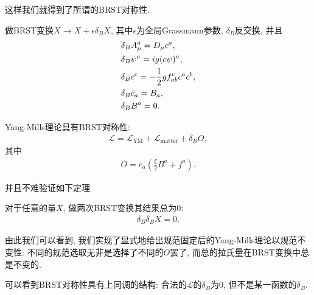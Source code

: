 这样我们就得到了所谓的BRST对称性.
\begin{definition}[BRST变换]
    做BRST变换$X\to X+\epsilon\delta_B X$, 其中$\epsilon$为全局Grassmann参数, $\delta_B$反交换, 并且
    \begin{align}
        & \delta_BA_\mu^a=D_\mu c^a,\notag\\
        & \delta_B\psi^a=ig(c\psi)^a,\notag\\
        & \delta_B c^c=-\frac12g f^{c}_{ab}c^ac^b,\notag\\
        & \delta_B\bar c_a=B_a,\notag\\
        & \delta_BB^a=0.
    \end{align}
\end{definition}
\begin{theorem}
    Yang-Mills理论具有BRST对称性:
    \begin{align}
        \mathcal L=\mathcal L_{\mathrm{YM}}+\mathcal L_{\mathrm{matter}}+\delta_BO,
    \end{align}
    其中
    \begin{align}
        O=\bar c_a\left(\frac\xi2B^a+f^a\right).
    \end{align}
\end{theorem}

并且不难验证如下定理
\begin{theorem}
    对于任意的量$X$, 做两次BRST变换其结果总为$0$:
    \begin{align}
        \delta_B\delta_BX=0.
    \end{align}
\end{theorem}

由此我们可以看到, 我们实现了显式地给出规范固定后的Yang-Mills理论以规范不变性: 不同的规范选取无非是选择了不同的$O$罢了, 而总的拉氏量在BRST变换中总是不变的. 

可以看到BRST对称性具有上同调的结构: 合法的$\mathcal L$的$\delta_B$为$0$, 但不是某一函数的$\delta_B$.

